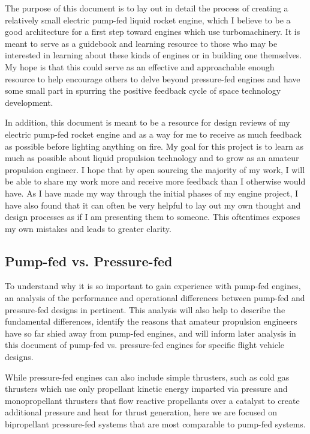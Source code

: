 \documentclass[12pt, letterpaper]{article}
\begin{document}
The purpose of this document is to lay out in detail the process of creating a relatively small electric pump-fed liquid rocket engine, which I believe to be a good architecture for a first step toward engines which use turbomachinery. It is meant to serve as a guidebook and learning resource to those who may be interested in learning about these kinds of engines or in building one themselves. My hope is that this could serve as an effective and approachable enough resource to help encourage others to delve beyond pressure-fed engines and have some small part in spurring the positive feedback cycle of space technology development.

In addition, this document is meant to be a resource for design reviews of my electric pump-fed rocket engine and as a way for me to receive as much feedback as possible before lighting anything on fire. My goal for this project is to learn as much as possible about liquid propulsion technology and to grow as an amateur propulsion engineer. I hope that by open sourcing the majority of my work, I will be able to share my work more and receive more feedback than I otherwise would have. As I have made my way through the initial phases of my engine project, I have also found that it can often be very helpful to lay out my own thought and design processes as if I am presenting them to someone. This oftentimes exposes my own mistakes and leads to greater clarity.

\subsection{Pump-fed vs. Pressure-fed}

To understand why it is so important to gain experience with pump-fed engines, an analysis of the performance and operational differences between pump-fed and pressure-fed designs in pertinent. This analysis will also help to describe the fundamental differences, identify the reasons that amateur propulsion engineers have so far shied away from pump-fed engines, and will inform later analysis in this document of pump-fed vs. pressure-fed engines for specific flight vehicle designs.

While pressure-fed engines can also include simple thrusters, such as cold gas thrusters which use only propellant kinetic energy imparted via pressure and monopropellant thrusters that flow reactive propellants over a catalyst to create additional pressure and heat for thrust generation, here we are focused on bipropellant pressure-fed systems that are most comparable to pump-fed systems.
\end{document}
